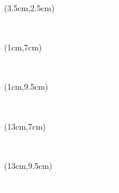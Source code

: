 \begin{titlepage}
    \thispagestyle{empty}

    

    \begin{textblock*}{14cm}(3.5cm,2.5cm)
        \begin{LARGE}
            \makeatletter
            \justifying

            \begin{center}
                \textbf{\textcolor{white}{\jobposition}}
                \\
                \textbf{\textcolor{white}{\thetitle}}
            \end{center}

            \makeatother
        \end{LARGE}
    \end{textblock*}

    \begin{textblock*}{10cm}(1cm,7cm)
        \begin{flushleft}
            \large
            \textbf{\textcolor{white}{NOM Prénom :}}
            \\
            \textbf{\textcolor{white}{\theauthor}}
        \end{flushleft}
    \end{textblock*}

    \begin{textblock*}{9cm}(1cm,9.5cm)
        \begin{flushleft}
            \large
            \textbf{\textcolor{white}{Responsable Pédagogique :}}
            \\
            \textbf{\textcolor{white}{\theRPeda}}
        \end{flushleft}
    \end{textblock*}


    \begin{textblock*}{7cm}(13cm,7cm)
        \begin{flushleft}
            \large
            \textbf{\textcolor{white}{Branche :}}
            \\
            \textcolor{white}{\theUE}
        \end{flushleft}
    \end{textblock*}

    \begin{textblock*}{7cm}(13cm,9.5cm)
        \begin{flushleft}
            \large
            \textbf{\textcolor{white}{Semestre :}}
            \\
            \textcolor{white}{\theSemestre}
        \end{flushleft}
    \end{textblock*}


\end{titlepage}
